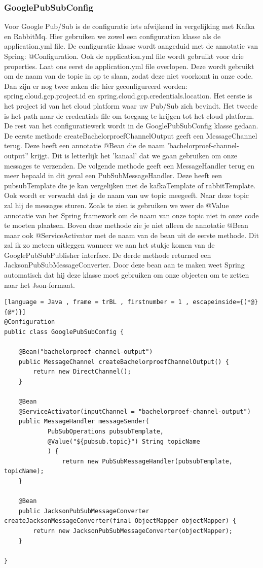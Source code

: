 \subsubsection{GooglePubSubConfig}
Voor Google Pub/Sub is de configuratie iets afwijkend in vergelijking met Kafka en RabbitMq. Hier gebruiken we zowel een configuration klasse als de application.yml file. De configuratie klasse wordt aangeduid met de annotatie van Spring: @Configuration. Ook de application.yml file wordt gebruikt voor drie properties. Laat ons eerst de application.yml file overlopen. Deze wordt gebruikt om de naam van de topic in op te slaan, zodat deze niet voorkomt in onze code. Dan zijn er nog twee zaken die hier geconfigureerd worden: spring.cloud.gcp.project.id en spring.cloud.gcp.credentials.location. Het eerste is het project id van het cloud platform waar uw Pub/Sub zich bevindt. Het tweede is het path naar de credentials file om toegang te krijgen tot het cloud platform. De rest van het configuratiewerk wordt in de GooglePubSubConfig klasse gedaan. De eerste methode createBachelorproefChannelOutput geeft een MessageChannel terug. Deze heeft een annotatie @Bean die de naam 'bachelorproef-channel-output'' krijgt. Dit is letterlijk het 'kanaal' dat we gaan gebruiken om onze messages te verzenden. De volgende methode geeft een MessageHandler terug en meer bepaald in dit geval een PubSubMessageHandler. Deze heeft een pubsubTemplate die je kan vergelijken met de kafkaTemplate of rabbitTemplate. Ook wordt er verwacht dat je de naam van uw topic meegeeft. Naar deze topic zal hij de messages sturen. Zoals te zien is gebruiken we weer de @Value annotatie van het Spring framework om de naam van onze topic niet in onze code te moeten plaatsen. Boven deze methode zie je niet alleen de annotatie @Bean maar ook @ServiceActivator met de naam van de bean uit de eerste methode. Dit zal ik zo meteen uitleggen wanneer we aan het stukje komen van de GooglePubSubPublisher interface. De derde methode returned een JacksonPubSubMessageConverter. Door deze bean aan te maken weet Spring automatisch dat hij deze klasse moet gebruiken om onze objecten om te zetten naar het Json-formaat.

\begin{lstlisting}[language = Java , frame = trBL , firstnumber = 1 , escapeinside={(*@}{@*)}]
@Configuration
public class GooglePubSubConfig {

    @Bean("bachelorproef-channel-output")
    public MessageChannel createBachelorproefChannelOutput() {
        return new DirectChannel();
    }

    @Bean
    @ServiceActivator(inputChannel = "bachelorproef-channel-output")
    public MessageHandler messageSender(
            PubSubOperations pubsubTemplate,
            @Value("${pubsub.topic}") String topicName
            ) {
                return new PubSubMessageHandler(pubsubTemplate, topicName);
    }

    @Bean
    public JacksonPubSubMessageConverter createJacksonMessageConverter(final ObjectMapper objectMapper) {
        return new JacksonPubSubMessageConverter(objectMapper);
    }

}
\end{lstlisting}
